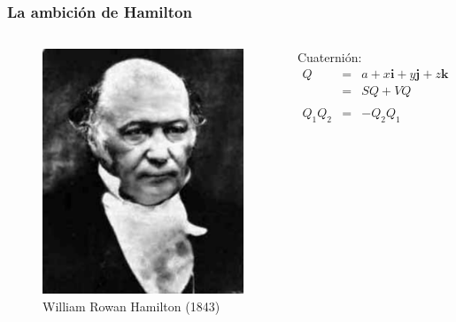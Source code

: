 \documentclass{beamer}
\begin{document}
\begin{frame}
    \frametitle{La ambición de Hamilton}
    \begin{columns}
        \begin{center}
            \begin{figure}
            \includegraphics[scale=0.4]{../gfx/hamilton}
                \caption{William Rowan Hamilton (1843)}
            \end{figure}
        \end{center}
       Cuaternión:
       \begin{eqnarray*}
           Q &=& a + x\bm{i} + y\bm{j} + z\bm{k} \\
           &=& SQ + VQ \\ \\
           Q_{1}Q_{2} &=& -Q_{2}Q_{1}  
       \end{eqnarray*}
    \end{columns}
\end{frame}
\end{document}
